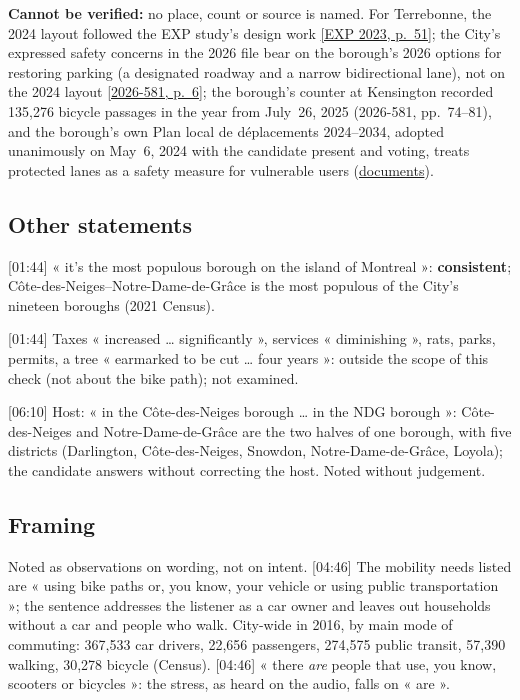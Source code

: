 \documentclass[11pt,letterpaper]{article}
\newcommand{\repourl}{https://github.com/OpenMobilityData/Terrebonne-open-sources}
\newcommand{\doc}[2]{\href{\repourl/blob/main/#1}{#2}}
\newcommand{\pagesurl}{https://openmobilitydata.github.io/Terrebonne-access-requests}
\newcommand{\cliptime}[1]{\textsf{\small[#1]}}
\newcommand{\pgl}[2]{\href{\pagesurl/2026-581/raw/01_emails_mandate_counts.pdf\#page=#1}{\textsf{\small[2026-581, p.~#2]}}}
\newcommand{\pg}[1]{\pgl{#1}{#1}}
\newcommand{\exppg}[1]{\href{\repourl/blob/main/2023-exp-mobility-study/raw/EXP_Etude_de_mobilite_rue_de_Terrebonne_2023.pdf}{\textsf{\small[EXP 2023, p.~#1]}}}
\begin{document}
\textbf{Cannot be verified:} no place, count or source is named. For
Terrebonne, the 2024 layout followed the EXP study's design work
\exppg{51}; the City's expressed safety concerns in the 2026 file bear on the
borough's 2026 options for restoring parking (a designated roadway and a
narrow bidirectional lane), not on the 2024 layout \pg{6}; the borough's
counter at Kensington recorded 135,276 bicycle passages in the year from
July~26, 2025 (2026-581, pp.~74--81), and the borough's own Plan local de
déplacements 2024--2034, adopted unanimously on May~6, 2024 with the candidate
present and voting, treats protected lanes as a safety measure for vulnerable
users (\doc{2024-cdn-ndg-pld/}{documents}).

\subsection{Other statements}

\cliptime{01:44} « it's the most populous borough on the island of Montreal »:
\textbf{consistent}; Côte-des-Neiges--Notre-Dame-de-Grâce is the most
populous of the City's nineteen boroughs (2021 Census).

\cliptime{01:44} Taxes « increased … significantly », services « diminishing »,
rats, parks, permits, a tree « earmarked to be cut … four years »: outside the
scope of this check (not about the bike path); not examined.

\cliptime{06:10} Host: « in the Côte-des-Neiges borough … in the NDG
borough »: Côte-des-Neiges and Notre-Dame-de-Grâce are the two halves of one
borough, with five districts (Darlington, Côte-des-Neiges, Snowdon,
Notre-Dame-de-Grâce, Loyola); the candidate answers without correcting the
host. Noted without judgement.

\subsection{Framing}

Noted as observations on wording, not on intent. \cliptime{04:46} The
mobility needs listed are « using bike paths or, you know, your vehicle or
using public transportation »; the sentence addresses the listener as a car
owner and leaves out households without a car and people who walk. City-wide
in 2016, by main mode of commuting: 367,533 car drivers, 22,656 passengers,
274,575 public transit, 57,390 walking, 30,278 bicycle (Census). \cliptime{04:46}
« there \emph{are} people that use, you know, scooters or bicycles »: the
stress, as heard on the audio, falls on « are ».
\end{document}
